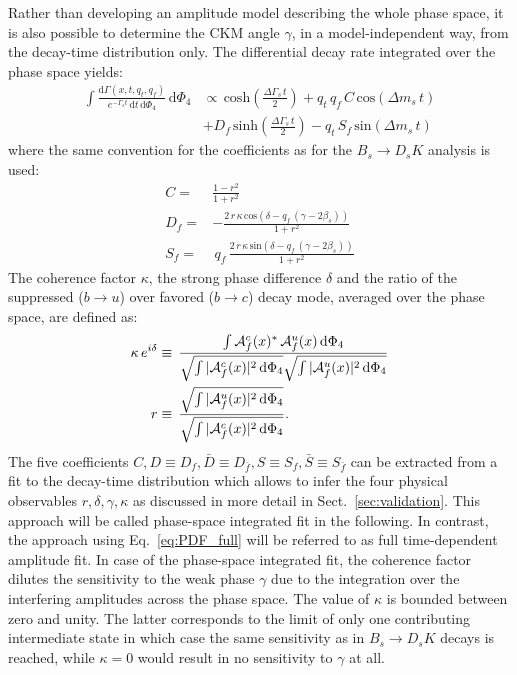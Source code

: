 Rather than developing an amplitude model describing the whole phase space,
it is also possible to determine the CKM angle $\gamma$, in a model-independent way, from the decay-time distribution only.
The differential decay rate  integrated over the phase space yields:
\begin{align}
\label{eq:PDF_intX}
	\nonumber
	\int \frac{\text{d}\Gamma(x,t,q_t,q_f)}{e^{- \Gamma_s t} \, \text{d}t \,  \text{d}\Phi_4}  \, \text{d}\Phi_4 &\propto    
	\, \text{cosh} \left( \frac{\Delta \Gamma_s \, t}{2}\right) 
	  + q_t \, q_f \, C \, \text{cos} \left( \Delta m_s \, t \right)   \\
	 & +  D_{f} \, \text{sinh} \left( \frac{\Delta \Gamma_s \, t}{2}\right)  
	  - q_t  \, S_{f}\, \text{sin} \left(\Delta m_s \, t \right)  
\end{align}
where the same convention for the \CP coefficients as for the $B_s \to D_s K$ analysis is used:
\begin{align}
\label{eq:CPcoeff}
	C= & \frac{1-r^2}{1+r^2}   \\
	D_{f} = &  -\frac{2 \, r \, \kappa \, \text{cos}\left(\delta-q_f \, (\gamma-2\beta_s)\right)}{1+r^2}   \\
	S_{f} = & \,  q_f \, \frac{2 \, r \, \kappa \, \text{sin}\left(\delta-q_f \, (\gamma-2\beta_s)\right)}{1+r^2}   
\end{align}
The coherence factor $\kappa$, the strong phase difference $\delta$ and the ratio of the suppressed ($b\to u$) over favored ($b\to c$) decay mode, averaged over the 
phase space, are defined as:
\begin{align}
\label{eq:coherenceFactor}
	\kappa \, e^{i\delta} &\equiv \, \frac{\int \mathcal A^c_f(x)^{*} \, \mathcal A^u_f(x)  \, \mathrm{d}\Phi_4}{\sqrt{\int \vert \mathcal A^c_f(x) \vert^2 \, \mathrm{d}\Phi_4} \sqrt{\int \vert \mathcal A^u_f(x) \vert^2 \, \mathrm{d}\Phi_4}  } \\
	r &\equiv \, \frac{\sqrt{\int \vert \mathcal A^u_f(x)\vert^2 \, \mathrm{d}\Phi_4 }}{\sqrt{\int \vert \mathcal A^c_f(x)\vert^2 \, \mathrm{d}\Phi_4}} .
\end{align}
The five \CP coefficients $C,D\equiv D_f,\bar D \equiv D_{\bar{f}},S \equiv S_f,\bar S \equiv S_{\bar{f}}$
can be extracted from a fit to the decay-time distribution
which allows to infer the four physical observables $r,\delta,\gamma,\kappa$ 
as discussed in more detail in Sect.~\ref{sec:validation}.
This approach will be called phase-space integrated fit in the following.
In contrast, the approach using Eq.~\ref{eq:PDF_full} will be referred to as full time-dependent amplitude fit. 
In case of the phase-space integrated fit, 
the coherence factor dilutes the sensitivity to the weak phase $\gamma$ due to the integration over the interfering amplitudes across the phase space.
The value of $\kappa$ is bounded between zero and unity.
The latter corresponds to the limit of only one contributing intermediate state in which case the same sensitivity as in $B_s \to D_s K$ decays is reached, 
while $\kappa = 0$ would result in no sensitivity to $\gamma$ at all.


